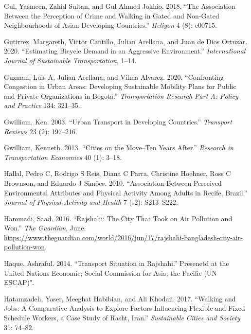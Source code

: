 \documentclass[]{elsarticle} %
\begin{document}
\leavevmode\hypertarget{ref-gul2018association}{}%
Gul, Yasmeen, Zahid Sultan, and Gul Ahmed Jokhio. 2018. ``The
Association Between the Perception of Crime and Walking in Gated and
Non-Gated Neighbourhoods of Asian Developing Countries.'' \emph{Heliyon}
4 (8): e00715.

\leavevmode\hypertarget{ref-gutierrez2020estimating}{}%
Gutirrez, Margareth, Victor Cantillo, Julian Arellana, and Juan de Dios
Ortuzar. 2020. ``Estimating Bicycle Demand in an Aggressive
Environment.'' \emph{International Journal of Sustainable
Transportation}, 1--14.

\leavevmode\hypertarget{ref-guzman2020confronting}{}%
Guzman, Luis A, Julian Arellana, and Vilma Alvarez. 2020. ``Confronting
Congestion in Urban Areas: Developing Sustainable Mobility Plans for
Public and Private Organizations in Bogotá.'' \emph{Transportation
Research Part A: Policy and Practice} 134: 321--35.

\leavevmode\hypertarget{ref-gwilliam2003urban}{}%
Gwilliam, Ken. 2003. ``Urban Transport in Developing Countries.''
\emph{Transport Reviews} 23 (2): 197--216.

\leavevmode\hypertarget{ref-gwilliam2013cities}{}%
Gwilliam, Kenneth. 2013. ``Cities on the Move--Ten Years After.''
\emph{Research in Transportation Economics} 40 (1): 3--18.

\leavevmode\hypertarget{ref-hallal2010association}{}%
Hallal, Pedro C, Rodrigo S Reis, Diana C Parra, Christine Hoehner, Ross
C Brownson, and Eduardo J Simões. 2010. ``Association Between Perceived
Environmental Attributes and Physical Activity Among Adults in Recife,
Brazil.'' \emph{Journal of Physical Activity and Health} 7 (s2):
S213--S222.

\leavevmode\hypertarget{ref-hammadi_2016}{}%
Hammadi, Saad. 2016. ``Rajshahi: The City That Took on Air Pollution and
Won.'' \emph{The Guardian}, June.
\url{https://www.theguardian.com/world/2016/jun/17/rajshahi-bangladesh-city-air-pollution-won}.

\leavevmode\hypertarget{ref-haque2014}{}%
Haque, Ashraful. 2014. ``Transport Situation in Rajshahi.'' Presenetd at
the United Nations Economic; Social Commission for Asia; the Pacific (UN
ESCAP)".

\leavevmode\hypertarget{ref-hatamzadeh2017walking}{}%
Hatamzadeh, Yaser, Meeghat Habibian, and Ali Khodaii. 2017. ``Walking
and Jobs: A Comparative Analysis to Explore Factors Influencing Flexible
and Fixed Schedule Workers, a Case Study of Rasht, Iran.''
\emph{Sustainable Cities and Society} 31: 74--82.
\end{document}

